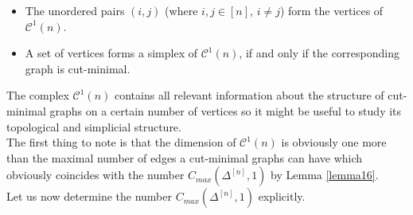 \begin{itemize}
\item The unordered pairs \((i,j)\) (where \(i,j\in [n]\text{, }i\neq j\)) form the vertices of \(\mathcal{C}^1(n)\).
\item A set of vertices forms a simplex of \(\mathcal{C}^1(n)\), if and only if the corresponding graph is cut-minimal.
\end{itemize}

The complex \(\mathcal{C}^1(n)\) contains all relevant information about the structure of cut-minimal graphs on a certain number of vertices so it might be useful to study its topological and simplicial structure.\\
The first thing to note is that the dimension of \(\mathcal{C}^1(n)\) is obviously one more than the maximal number of edges a cut-minimal graphs can have which obviously coincides with the number \(C_{max}(\Delta^{[n]},1)\) by Lemma \ref{lemma16}.
\\
Let us now determine the number \(C_{max}(\Delta^{[n]},1)\) explicitly.
